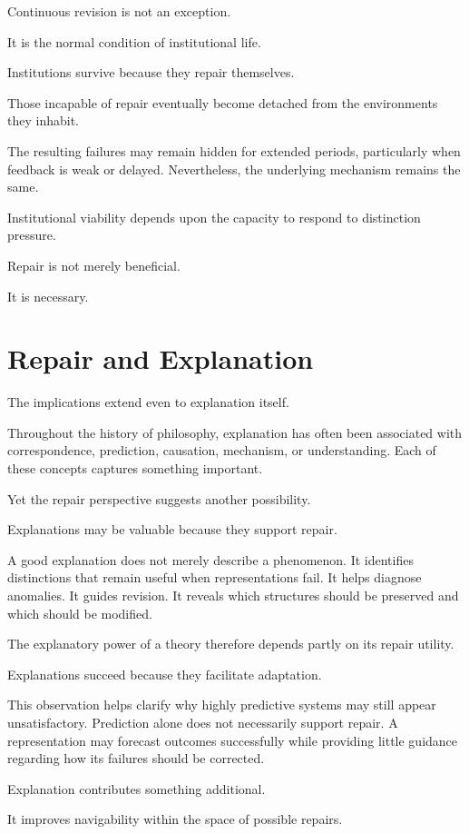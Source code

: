 \documentclass[11pt,oneside,openany]{book}
\begin{document}
Continuous revision is not an exception.

It is the normal condition of institutional life.

Institutions survive because they repair themselves.

Those incapable of repair eventually become detached from the environments they inhabit.

The resulting failures may remain hidden for extended periods, particularly when feedback is weak or delayed. Nevertheless, the underlying mechanism remains the same.

Institutional viability depends upon the capacity to respond to distinction pressure.

Repair is not merely beneficial.

It is necessary.

\section{Repair and Explanation}

The implications extend even to explanation itself.

Throughout the history of philosophy, explanation has often been associated with correspondence, prediction, causation, mechanism, or understanding. Each of these concepts captures something important.

Yet the repair perspective suggests another possibility.

Explanations may be valuable because they support repair.

A good explanation does not merely describe a phenomenon. It identifies distinctions that remain useful when representations fail. It helps diagnose anomalies. It guides revision. It reveals which structures should be preserved and which should be modified.

The explanatory power of a theory therefore depends partly on its repair utility.

Explanations succeed because they facilitate adaptation.

This observation helps clarify why highly predictive systems may still appear unsatisfactory. Prediction alone does not necessarily support repair. A representation may forecast outcomes successfully while providing little guidance regarding how its failures should be corrected.

Explanation contributes something additional.

It improves navigability within the space of possible repairs.
\end{document}
